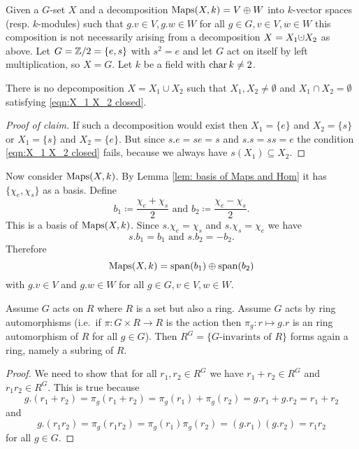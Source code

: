\begin{expl}
 Given a $G$-set $X$ and a decomposition $\operatorname{Maps}(X,k) = V \oplus W$ into $k$-vector spaces (resp. $k$-modules) such that $g.v \in V, g.w \in W$ for all $g \in G, v \in V, w \in W$ this composition is not necessarily arising from a decomposition $X = X_1 \dotcup X_2$ as above.
 Let $G = \mathbb{Z}/2 = \{e,s\}$ with $s^2 = e$ and let $G$ act on itself by left multiplication, so $X = G$. Let $k$ be a field with $\operatorname{char} k \neq 2$.
 \begin{claim}
  There is no depcomposition $X = X_1 \cup X_2$ such that $X_1, X_2 \neq \emptyset$ and $X_1 \cap X_2 = \emptyset$ satisfying \eqref{eqn:X_1 X_2 closed}.
 \end{claim}
 \begin{proof}[Proof of claim]
  If such a decomposition would exist then $X_1 = \{e\}$ and $X_2 = \{s\}$ or $X_1 = \{s\}$ and $X_2 = \{e\}$. But since $s.e = se = s$ and $s.s = ss = e$ the condition \eqref{eqn:X_1 X_2 closed} fails, because we always have $s(X_1) \subseteq X_2$.
 \end{proof}
 Now consider $\operatorname{Maps}(X,k)$. By Lemma \ref{lem: basis of Maps and Hom} it has $\{\chi_e,\chi_s\}$ as a basis. Define
 \[
  b_1 \coloneqq \frac{\chi_e + \chi_s}{2} \text{ and } b_2 \coloneqq \frac{\chi_e - \chi_s}{2}.
 \]
 This is a basis of $\operatorname{Maps}(X,k)$. Since $s.\chi_e = \chi_s$ and $s.\chi_s = \chi_e$ we have
 \[
  s.b_1 = b_1 \text{ and } s.b_2 = -b_2.
 \]
 Therefore
 \[
  \operatorname{Maps}(X,k) = \operatorname{span}(b_1) \oplus \operatorname{span}(b_2)
 \]
 with $g.v \in V$ and $g.w \in W$ for all $g \in G, v \in V, w \in W$.
\end{expl}


\begin{lem}\label{lem: group action by ring automorphisms}
 Assume $G$ acts on $R$ where $R$ is a set but also a ring. Assume $G$ acts by ring automorphisms (i.e.\ if $\pi \colon G \times R \to R$ is the action then $\pi_g \colon r \mapsto g.r$ is an ring automorphism of $R$ for all $g \in G$). Then $R^G = \{\text{$G$-invarints of $R$}\}$ forms again a ring, namely a subring of $R$.
\end{lem}
\begin{proof}
 We need to show that for all $r_1, r_2 \in R^G$ we have $r_1 + r_2 \in R^G$ and $r_1 r_2 \in R^G$. This is true because
 \[
  g.(r_1 + r_2) = \pi_g(r_1 + r_2) = \pi_g(r_1) + \pi_g(r_2) = g.r_1 + g.r_2 = r_1 + r_2
 \]
 and
 \[
  g.(r_1 r_2) = \pi_g(r_1 r_2) = \pi_g(r_1) \pi_g(r_2) = (g.r_1)(g.r_2) = r_1 r_2
 \]
 for all $g \in G$.
\end{proof}


